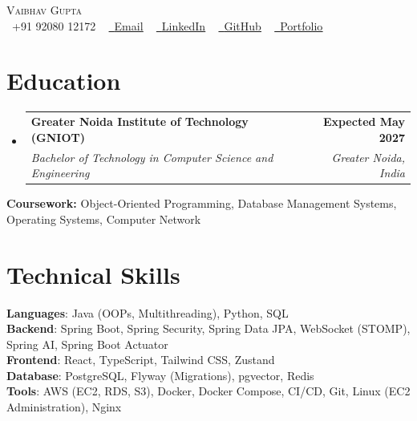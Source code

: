 \documentclass[letterpaper,10pt]{article}
\makeatletter
\newcommand{\resumeSubheading}[4]{
  \vspace{-2pt}\item
    \begin{tabular*}{1.0\textwidth}[t]{l@{\extracolsep{\fill}}r}
      \textbf{#1} & \textbf{\small #2} \\
      \textit{\small#3} & \textit{\small #4} \\
    \end{tabular*}\vspace{-7pt}
}
\newcommand{\resumeSubHeadingListStart}{\begin{itemize}[leftmargin=0.0in, label={}]}
\newcommand{\resumeSubHeadingListEnd}{\end{itemize}}
\makeatother
\begin{document}

\begin{center}
    {\Huge \scshape Vaibhav Gupta} \\ \vspace{1pt}
    \small \raisebox{-0.1\height}\faPhone\ +91 92080 12172 ~
    \href{mailto:vaibhv19.business@gmail.com}{\raisebox{-0.2\height}\faEnvelope\ \underline{Email}} ~
    \href{https://linkedin.com/in/vaibhv19}{\raisebox{-0.2\height}\faLinkedin\ \underline{LinkedIn}} ~
    \href{https://github.com/vaibhv19}{\raisebox{-0.2\height}\faGithub\ \underline{GitHub}} ~
    \href{https://vaibhv19.dev}{\raisebox{-0.2\height}\faGlobe\ \underline{Portfolio}}
    \vspace{-8pt}
\end{center}

\section{Education}
  \resumeSubHeadingListStart
    \resumeSubheading
      {Greater Noida Institute of Technology (GNIOT)}{Expected May 2027}
      {Bachelor of Technology in Computer Science and Engineering}{Greater Noida, India}
  \resumeSubHeadingListEnd
  \vspace{-6pt}
  \begin{itemize}[leftmargin=0in, label={}]
    \small{\item{\textbf{Coursework:} Object-Oriented Programming, Database Management Systems, Operating Systems, Computer Network}}
    \vspace{-10pt}
\end{itemize}

\section{Technical Skills}
 \begin{itemize}[leftmargin=0in, label={}]
    \small{\item{
     \textbf{Languages}{: Java (OOPs, Multithreading), Python, SQL} \\
     \textbf{Backend}{: Spring Boot, Spring Security, Spring Data JPA, WebSocket (STOMP), Spring AI, Spring Boot Actuator} \\
     \textbf{Frontend}{: React, TypeScript, Tailwind CSS, Zustand} \\
     \textbf{Database}{: PostgreSQL, Flyway (Migrations), pgvector, Redis} \\
     \textbf{Tools}{: AWS (EC2, RDS, S3), Docker, Docker Compose, CI/CD, Git, Linux (EC2 Administration), Nginx} \\
    }}
 \end{itemize}
 \vspace{-16pt}
\end{document}
